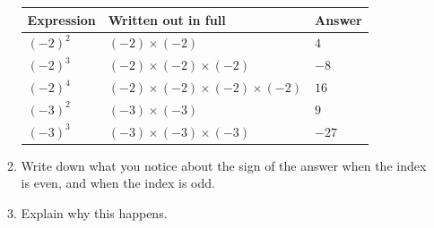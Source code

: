 \documentclass[12pt,a4paper]{article}
\newcommand{\ans}[1]{\textcolor{answer}{#1}}
\begin{document}
\begin{enumerate}[resume]
\begin{enumerate}
\vspace{2pt}
\begin{center}
\renewcommand{\arraystretch}{1.8}
\begin{tabular}{|>{\centering\arraybackslash}p{2.4cm}|>{\centering\arraybackslash}p{6.4cm}|>{\centering\arraybackslash}p{2.4cm}|}
\hline
\textbf{Expression} & \textbf{Written out in full} & \textbf{Answer}\\
\hline
$(-2)^2$ & $(-2)\times(-2)$ & $4$\\ \hline
$(-2)^3$ & $(-2)\times(-2)\times(-2)$ & \ans{$-8$}\\ \hline
$(-2)^4$ & \ans{$(-2)\times(-2)\times(-2)\times(-2)$} & \ans{$16$}\\ \hline
$(-3)^2$ & \ans{$(-3)\times(-3)$} & \ans{$9$}\\ \hline
$(-3)^3$ & \ans{$(-3)\times(-3)\times(-3)$} & \ans{$-27$}\\ \hline
\end{tabular}
\end{center}

  \item Write down what you notice about the sign of the answer when the index
        is even, and when the index is odd.

\vspace{6pt}

\vspace{16pt}
  \item Explain why this happens.

\vspace{6pt}
\end{enumerate}

\end{enumerate}
\end{document}
